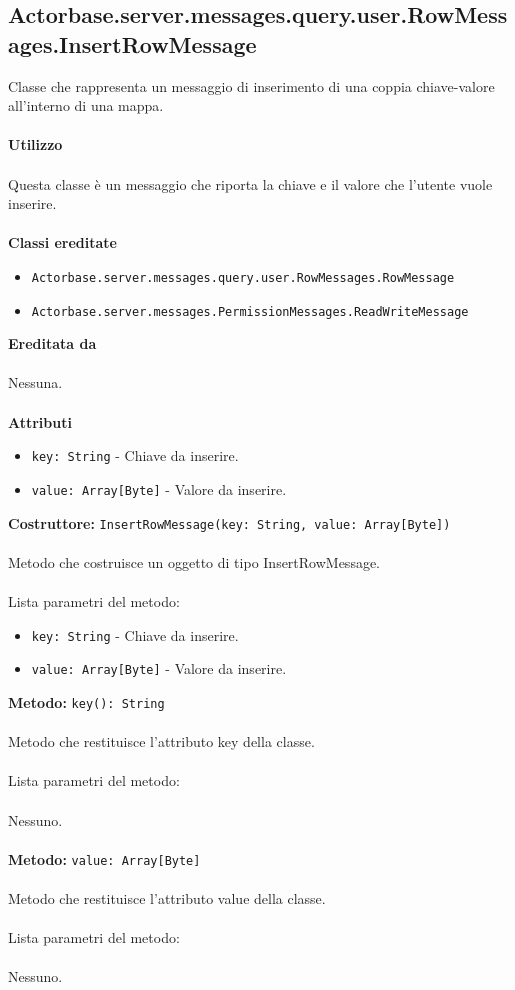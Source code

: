 \documentclass[a4paper]{article}
\begin{document}
	\subsection{Actorbase.server.messages.query.user.RowMessages.InsertRowMessage}
		Classe che rappresenta un messaggio di inserimento di una coppia chiave-valore all'interno di una mappa.
			\\ \\
		\textbf{Utilizzo}
			\\ \\
		Questa classe è un messaggio che riporta la chiave e il valore che l'utente vuole inserire.
			\\ \\
		\textbf{Classi ereditate}
			\begin{itemize}
				\item \texttt{Actorbase.server.messages.query.user.RowMessages.RowMessage }
				\item \texttt{Actorbase.server.messages.PermissionMessages.ReadWriteMessage }
			\end{itemize}
		\textbf{Ereditata da}
			\\ \\
			Nessuna.
			\\ \\
		\textbf{Attributi}
			\begin{itemize}
				\item \texttt{key: String} - Chiave da inserire.
				\item \texttt{value: Array[Byte]} - Valore da inserire.
			\end{itemize}
		\textbf{Costruttore: }\texttt{InsertRowMessage(key: String, value: Array[Byte])}
			\\ \\
		Metodo che costruisce un oggetto di tipo InsertRowMessage.
			\\ \\
		Lista parametri del metodo:
			\begin{itemize}
				\item \texttt{key: String} - Chiave da inserire.
				\item \texttt{value: Array[Byte]} - Valore da inserire.
			\end{itemize}
		\textbf{Metodo: }\texttt{key(): String}
			\\ \\
		Metodo che restituisce l'attributo key della classe.
			\\ \\
		Lista parametri del metodo:
			\\ \\
			Nessuno.
			\\ \\
		\textbf{Metodo: }\texttt{value: Array[Byte]}
			\\ \\
		Metodo che restituisce l'attributo value della classe.
			\\ \\
		Lista parametri del metodo:
			\\ \\
			Nessuno.		
		
\end{document}
